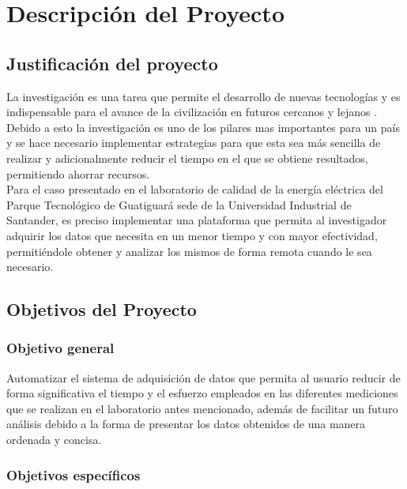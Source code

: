 
\chapter{Descripción del Proyecto}

\section{Justificación del proyecto}

La investigación es una tarea que permite el desarrollo de nuevas tecnologías y es indispensable para el avance de la civilización en futuros cercanos y lejanos \cite{Noguera2016}.  %
Debido a esto la investigación es uno de los pilares mas importantes para un país y se hace necesario implementar estrategias para que esta sea más sencilla de realizar y adicionalmente reducir el tiempo en el que se obtiene resultados, permitiendo ahorrar recursos. \\  

Para el caso presentado en el laboratorio de calidad de la energía eléctrica del Parque Tecnológico de Guatiguará sede de la Universidad Industrial de Santander, es preciso implementar una plataforma que permita al investigador adquirir los datos que necesita en un menor tiempo y con mayor efectividad, permitiéndole obtener y analizar los mismos de forma remota cuando le sea necesario. 


\section{Objetivos del Proyecto}

\subsection{Objetivo general}

Automatizar el sistema de adquisición de datos que permita al usuario reducir de forma significativa el tiempo y el esfuerzo empleados en las diferentes mediciones que se realizan en el laboratorio antes mencionado, además de facilitar un futuro análisis debido a la forma de presentar los datos obtenidos de una manera ordenada y concisa. 

\subsection{Objetivos específicos}

